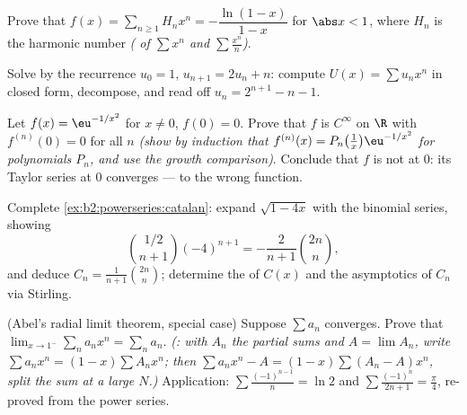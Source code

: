 \begin{exercise}[$\star\star$]\label{exo:b2:powerseries:5}
Prove that $f(x) = \sum_{n\geq1} H_n x^n = -\dfrac{\ln(1 -
x)}{1 - x}$ for $\abs x < 1$, where $H_n$ is the harmonic number
\emph{( of $\sum x^n$ and $\sum \frac{x^n}{n}$)}.
\end{exercise}

\begin{exercise}[$\star\star$]\label{exo:b2:powerseries:6}
Solve by  the recurrence $u_0 = 1$, $u_{n+1} =
2u_n + n$: compute $U(x) = \sum u_nx^n$ in closed form, decompose,
and read off $u_n = 2^{n+1} - n - 1$.
\end{exercise}

\begin{exercise}[$\star\star$]\label{exo:b2:powerseries:7}
Let $f(x) = \eu^{-1/x^2}$ for $x \neq 0$, $f(0) = 0$. Prove that
$f$ is $C^\infty$ on $\R$ with $f^{(n)}(0) = 0$ for all $n$
\emph{(show by induction that $f^{(n)}(x) = P_n\bigl(\frac1x\bigr)
\eu^{-1/x^2}$ for polynomials $P_n$, and use the growth
comparison)}. Conclude that $f$ is not  at $0$: its Taylor
series at $0$ converges --- to the wrong function.
\end{exercise}

\begin{exercise}[$\star\star\star$]\label{exo:b2:powerseries:8}
Complete \cref{ex:b2:powerseries:catalan}: expand $\sqrt{1 - 4x}$
with the binomial series, showing
\[
\binom{1/2}{n+1}(-4)^{n+1} = -\frac{2}{n+1}\binom{2n}{n},
\]
and deduce $C_n = \frac{1}{n+1}\binom{2n}{n}$; determine the  of $C(x)$ and the asymptotics of $C_n$ via
Stirling.
\end{exercise}

\begin{exercise}[$\star\star\star$]\label{exo:b2:powerseries:9}
(Abel's radial limit theorem, special case) Suppose $\sum a_n$
converges. Prove that $\lim_{x \to 1^-} \sum_{n} a_n x^n = \sum_n
a_n$. \emph{(: with $A_n$ the partial sums and $A =
\lim A_n$, write $\sum a_nx^n = (1 - x)\sum A_n x^n$; then $\sum
a_nx^n - A = (1-x)\sum (A_n - A)x^n$, split the sum at a large
$N$.)} Application: $\sum \frac{(-1)^{n-1}}{n} = \ln 2$ and $\sum
\frac{(-1)^n}{2n+1} = \frac\pi4$, re-proved from the power series.
\end{exercise}

